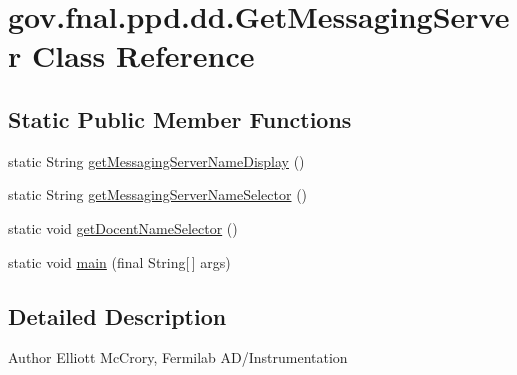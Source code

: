 \hypertarget{classgov_1_1fnal_1_1ppd_1_1dd_1_1GetMessagingServer}{\section{gov.\-fnal.\-ppd.\-dd.\-Get\-Messaging\-Server Class Reference}
\label{classgov_1_1fnal_1_1ppd_1_1dd_1_1GetMessagingServer}
}
\subsection*{Static Public Member Functions}
\begin{DoxyCompactItemize}
\item 
static String \hyperlink{classgov_1_1fnal_1_1ppd_1_1dd_1_1GetMessagingServer_a3b0e216307cae3742f3ff70aaf9ef8dc}{get\-Messaging\-Server\-Name\-Display} ()
\item 
static String \hyperlink{classgov_1_1fnal_1_1ppd_1_1dd_1_1GetMessagingServer_a61de9f8eb9c7e50565eb7d3d4f000cbb}{get\-Messaging\-Server\-Name\-Selector} ()
\item 
static void \hyperlink{classgov_1_1fnal_1_1ppd_1_1dd_1_1GetMessagingServer_afc14215a5c0b6624787c91e4d9501118}{get\-Docent\-Name\-Selector} ()
\item 
static void \hyperlink{classgov_1_1fnal_1_1ppd_1_1dd_1_1GetMessagingServer_a06768dfe96070006b7b3907a52def51e}{main} (final String\mbox{[}$\,$\mbox{]} args)
\end{DoxyCompactItemize}


\subsection{Detailed Description}
\begin{DoxyAuthor}{Author}
Elliott Mc\-Crory, Fermilab A\-D/\-Instrumentation 
\end{DoxyAuthor}


